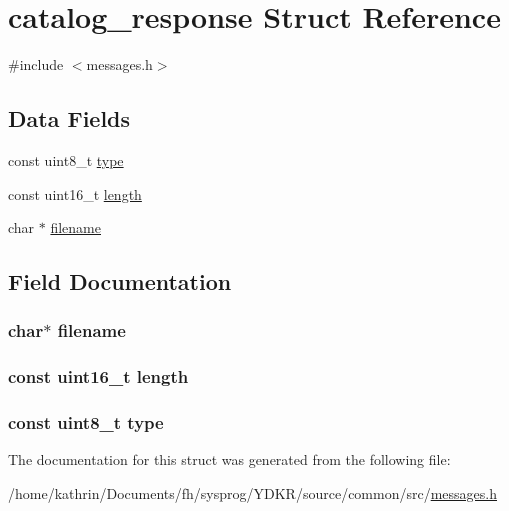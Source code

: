 \hypertarget{structcatalog__response}{
\section{catalog\_\-response Struct Reference}
\label{structcatalog__response}
}


{\ttfamily \#include $<$messages.h$>$}

\subsection*{Data Fields}
\begin{DoxyCompactItemize}
\item 
const uint8\_\-t \hyperlink{structcatalog__response_aca7dafb0092715a03dd40f45fc607f2a}{type}
\item 
const uint16\_\-t \hyperlink{structcatalog__response_a7767ba464d90fc91ad318d4e182b94d7}{length}
\item 
char $\ast$ \hyperlink{structcatalog__response_aeac90097f29f7529968697163cea5c18}{filename}
\end{DoxyCompactItemize}


\subsection{Field Documentation}
\hypertarget{structcatalog__response_aeac90097f29f7529968697163cea5c18}{
\subsubsection[{filename}]{\setlength{\rightskip}{0pt plus 5cm}char$\ast$ {\bf filename}}}
\label{structcatalog__response_aeac90097f29f7529968697163cea5c18}
\hypertarget{structcatalog__response_a7767ba464d90fc91ad318d4e182b94d7}{
\subsubsection[{length}]{\setlength{\rightskip}{0pt plus 5cm}const uint16\_\-t {\bf length}}}
\label{structcatalog__response_a7767ba464d90fc91ad318d4e182b94d7}
\hypertarget{structcatalog__response_aca7dafb0092715a03dd40f45fc607f2a}{
\subsubsection[{type}]{\setlength{\rightskip}{0pt plus 5cm}const uint8\_\-t {\bf type}}}
\label{structcatalog__response_aca7dafb0092715a03dd40f45fc607f2a}


The documentation for this struct was generated from the following file:\begin{DoxyCompactItemize}
\item 
/home/kathrin/Documents/fh/sysprog/YDKR/source/common/src/\hyperlink{messages_8h}{messages.h}\end{DoxyCompactItemize}
